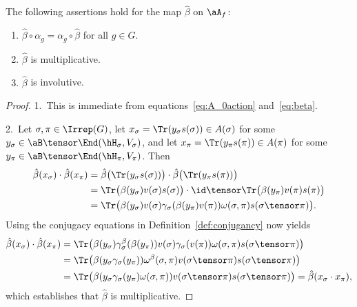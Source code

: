 \begin{Lemma}\label{lem:prop_beta}
	The following assertions hold for the map $\hat \beta$ on $\aA_f$:
	\begin{enumerate}\itemsep=0pt
	\item[$1.$]
		$\hat\beta \circ \alpha_g = \alpha_g \circ \hat \beta$ for all $g \in G$.
	\item[$2.$]
		$\hat\beta$ is multiplicative.
	\item[$3.$]
		$\hat\beta$ is involutive.
	\end{enumerate}
\end{Lemma}
\begin{proof}1.~This is immediate from equations~\eqref{eq:A_0action} and~\eqref{eq:beta}.

2.~Let $\sigma, \pi \in \Irrep(G)$, let $x_\sigma = \Tr (y_\sigma s(\sigma)) \in A(\sigma)$ for some $y_\sigma \in \aB \tensor \End(\hH_\sigma, V_\sigma)$, and let $x_\pi = \Tr ( y_\pi s(\pi) ) \in A(\pi)$ for some $y_\pi \in \aB \tensor \End(\hH_\pi, V_\pi)$.
		Then
		\begin{align*}
			\hat\beta(x_\sigma) \cdot \hat\beta(x_\pi)
			&=
			\hat\beta \bigl( \Tr( y_\sigma s(\sigma) ) \bigr)
			\cdot \hat \beta \bigl( \Tr (y_\pi s(\pi) ) \bigr)
			\\
			&=
			\Tr \bigl( \beta(y_\sigma) v(\sigma) s(\sigma) \bigr)
			\cdot \id \tensor \Tr \bigl( \beta(y_\pi) v(\pi) s(\pi) \bigr)
			\\
			&=
			\Tr \bigl( \beta(y_\sigma) v(\sigma) \gamma_\sigma ( \beta(y_\pi) v(\pi) ) \omega(\sigma, \pi) s(\sigma \tensor \pi) \bigr).
		\end{align*}
		Using the conjugacy equations in Definition~\ref{def:conjugancy} now yields
		\begin{align*}
			\hat\beta(x_\sigma) \cdot \hat\beta(x_\pi)
			&=
			\Tr \bigl( \beta(y_\sigma) \gamma^\beta_\sigma ( \beta(y_\pi) ) v(\sigma) \gamma_\sigma ( v(\pi) ) \omega(\sigma, \pi) s(\sigma \tensor \pi) \bigr)
			\\
			&= \Tr \bigl( \beta ( y_\sigma \gamma_\sigma(y_\pi) ) \omega^\beta(\sigma, \pi) v(\sigma \tensor \pi) s(\sigma \tensor \pi) \bigr)
			\\
			&= \Tr \bigl( \beta ( y_\sigma \gamma_\sigma(y_\pi) \omega(\sigma, \pi) ) v(\sigma \tensor \pi) s(\sigma \tensor \pi) \bigr)
			=
			\hat\beta(x_\sigma \cdot x_\pi),
		\end{align*}
		which establishes that $\hat\beta$ is multiplicative.


\end{proof}

